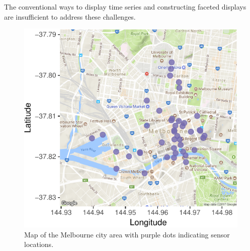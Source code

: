 \documentclass[article]{jss}
\theoremstyle{definition}
\theoremstyle{definition}
\theoremstyle{definition}
\theoremstyle{remark}
\begin{document}
The conventional ways to display time series and constructing faceted
displays are insufficient to address these challenges.

\begin{CodeChunk}
\begin{figure}

{\centering \includegraphics[width=0.55\linewidth]{figure/ped-map-1} 

}

\caption[Map of the Melbourne city area with purple dots
indicating sensor locations.]{Map of the Melbourne city area with purple dots
indicating sensor locations.}\label{fig:ped-map}
\end{figure}
\end{CodeChunk}
\end{document}
